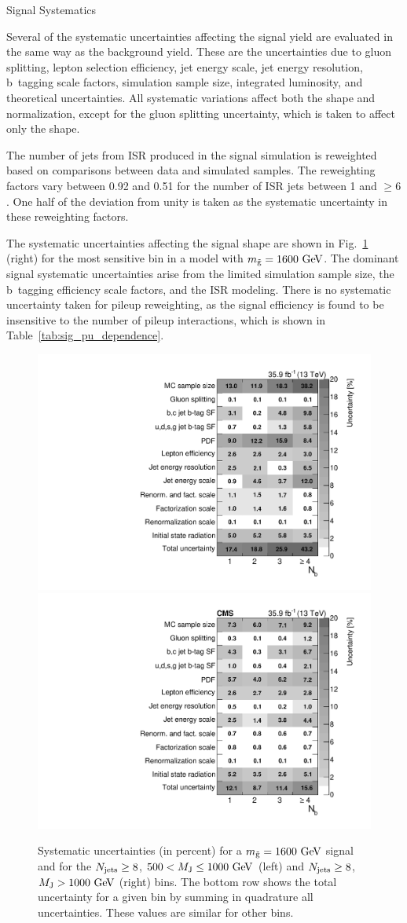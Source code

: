 \begin{section}{Signal Systematics}

Several of the systematic uncertainties affecting the signal yield are evaluated in the same way as the background yield.
These are the uncertainties due to gluon splitting, lepton selection efficiency, jet energy scale, jet energy resolution, b~tagging scale factors, simulation sample size, integrated luminosity, and theoretical uncertainties.
All systematic variations affect both the \Nb shape and normalization, except for the gluon splitting uncertainty, which is taken to affect only the \Nb shape.

The number of jets from ISR produced in the signal simulation is reweighted based on comparisons between data and simulated \ttbar samples.
The reweighting factors vary between 0.92 and 0.51 for the number of ISR jets between 1 and $\ge6$.
One half of the deviation from unity is taken as the systematic uncertainty in these reweighting factors.

The systematic uncertainties affecting the signal \Nb shape are shown in Fig.~\ref{fig:sig_sys_tables} (right) for the most sensitive bin in a model with $m_{\tilde{\mathrm{g}}} = 1600~\mathrm{Ge\kern -0.1em V}$.
The dominant signal systematic uncertainties arise from the limited simulation sample size, the b~tagging efficiency scale factors, and the ISR modeling.
There is no systematic uncertainty taken for pileup reweighting, as the signal efficiency is found to be insensitive to the number of pileup interactions, which is shown in Table~\ref{tab:sig_pu_dependence}.

\begin{figure}[tbp!]
\begin{center}
\includegraphics[angle=0,width=0.45\columnwidth]{fig/table_sig_systs_bin20_m1600.pdf}
\includegraphics[angle=0,width=0.45\columnwidth]{fig/table_sig_systs_bin21_m1600.pdf}
\end{center}
\caption{Systematic uncertainties (in percent) for a $m_{\tilde{\mathrm{g}}} = 1600~\mathrm{Ge\kern -0.1em V}$ signal and for the $N_{\mathrm{jets}} \geq 8$, $500 < M_{\mathrm{J}} \leq 1000~\mathrm{Ge\kern -0.1em V}$ (left) and $N_{\mathrm{jets}} \geq 8$, $M_{\mathrm{J}} > 1000~\mathrm{Ge\kern -0.1em V}$ (right) bins.
The bottom row shows the total uncertainty for a given \Nb bin by summing in quadrature all uncertainties.
These values are similar for other bins.}
\label{fig:sig_sys_tables}
\end{figure}


\end{section}
